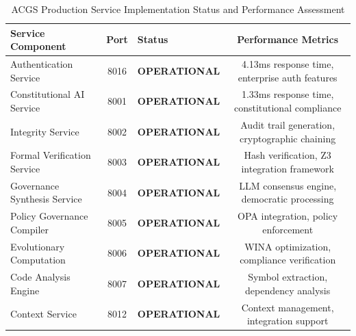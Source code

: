 \documentclass[manuscript,screen,9pt]{acmart}
\newcommand{\tablesize}{\footnotesize}
\newcommand{\tableheader}[1]{\textbf{#1}}
\begin{document}
\begin{figure}[!htb]
	\label{fig:architecture}
\end{figure}

\begin{table}[!htb]
	\centering
	\caption{ACGS Production Service Implementation Status and Performance Assessment}
	\label{tab:implementation_status}
	\tablesize
	\begin{tabular}{@{}lclc@{}}
		\toprule
		\tableheader{Service Component} & \tableheader{Port} & \tableheader{Status} & \tableheader{Performance Metrics}               \\
		\midrule
		Authentication Service          & 8016               & \textbf{OPERATIONAL} & 4.13ms response time, enterprise auth features  \\
		Constitutional AI Service       & 8001               & \textbf{OPERATIONAL} & 1.33ms response time, constitutional compliance \\
		Integrity Service               & 8002               & \textbf{OPERATIONAL} & Audit trail generation, cryptographic chaining  \\
		Formal Verification Service     & 8003               & \textbf{OPERATIONAL} & Hash verification, Z3 integration framework     \\
		Governance Synthesis Service    & 8004               & \textbf{OPERATIONAL} & LLM consensus engine, democratic processing     \\
		Policy Governance Compiler      & 8005               & \textbf{OPERATIONAL} & OPA integration, policy enforcement             \\
		Evolutionary Computation        & 8006               & \textbf{OPERATIONAL} & WINA optimization, compliance verification      \\
		Code Analysis Engine            & 8007               & \textbf{OPERATIONAL} & Symbol extraction, dependency analysis          \\
		Context Service                 & 8012               & \textbf{OPERATIONAL} & Context management, integration support         \\

\end{tabular}
\end{table}
\end{document}

